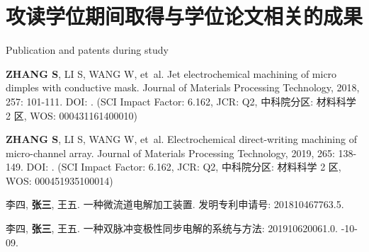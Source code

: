 \chapter{攻读学位期间取得与学位论文相关的成果}{Publication and patents during study}


\begin{results}
  \item 
  \textbf{ZHANG S}, LI S, WANG W, et~al.
  \newblock
  Jet electrochemical machining of micro dimples with conductive mask\allowbreak[J/OL].
  \newblock
  Journal of Materials Processing Technology, 2018, 257: 101-111.
  \newblock
  DOI: .
  \newblock
  (SCI Impact Factor: 6.162, JCR: Q2, 中科院分区: 材料科学 2 区, WOS: 000431161400010)
  \item 
  \textbf{ZHANG S}, LI S, WANG W, et~al.
  \newblock
  Electrochemical direct-writing machining of micro-channel array\allowbreak[J/OL].
  \newblock
  Journal of Materials Processing Technology, 2019, 265: 138-149.
  \newblock
  DOI: .
  \newblock
  (SCI Impact Factor: 6.162, JCR: Q2, 中科院分区: 材料科学 2 区, WOS: 000451935100014)
\end{results}


\begin{results}
  \item 
  李四, \textbf{张三}, 王五.
  \newblock
  一种微流道电解加工装置.
  \newblock
  发明专利申请号: 201810467763.5.
  \item 
  李四, \textbf{张三}, 王五.
  \newblock
  一种双脉冲变极性同步电解的系统与方法: 201910620061.0\allowbreak[P].
  -10-09.
\end{results}